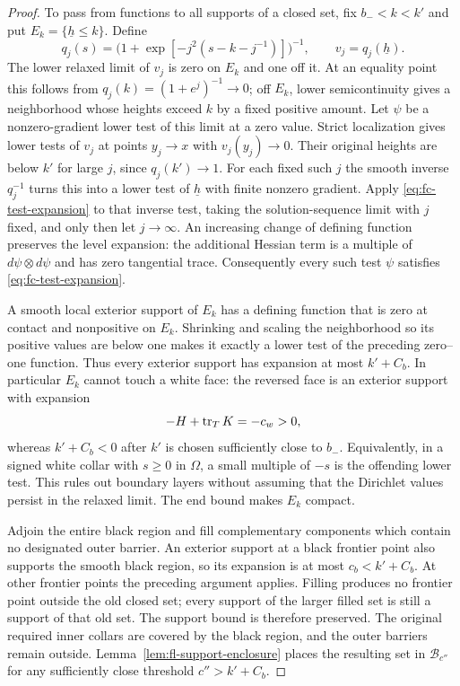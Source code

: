 \begin{proof}
To pass from functions to all supports of a closed set, fix
$b_-<k<k'$ and put $E_k=\{\underline h\le k\}$.  Define
\[
 q_j(s)=\bigl(1+\exp[-j^2(s-k-j^{-1})]\bigr)^{-1},
 \qquad v_j=q_j(\underline h).
\]
The lower relaxed limit of $v_j$ is zero on $E_k$ and one off it.
At an equality point this follows from
$q_j(k)=(1+e^j)^{-1}\to0$; off $E_k$, lower semicontinuity gives
a neighborhood whose heights exceed $k$ by a fixed positive amount.
Let $\psi$ be a nonzero-gradient lower test of this limit at a zero
value.  Strict localization gives lower tests of $v_j$ at points
$y_j\to x$ with $v_j(y_j)\to0$.  Their original heights are below
$k'$ for large $j$, since $q_j(k')\to1$.  For each fixed such $j$
the smooth inverse $q_j^{-1}$ turns this into a lower test of
$\underline h$ with finite nonzero gradient.  Apply
\eqref{eq:fc-test-expansion} to that inverse test, taking the
solution-sequence limit with $j$ fixed, and only then let
$j\to\infty$.  An increasing change of defining function preserves
the level expansion: the additional Hessian term is a multiple of
$d\psi\otimes d\psi$ and has zero tangential trace.  Consequently
every such test $\psi$ satisfies
\eqref{eq:fc-test-expansion}.

A smooth local exterior support of $E_k$ has a defining function
that is zero at contact and nonpositive on $E_k$.  Shrinking and
scaling the neighborhood so its positive values are below one
makes it exactly a lower test of the preceding zero--one function.
Thus every exterior support has expansion at most $k'+C_b$.
In particular $E_k$ cannot touch a white face: the reversed face is
an exterior support with expansion
\[
 -H+\operatorname{tr}_TK=-c_w>0,
\]
whereas $k'+C_b<0$ after $k'$ is chosen sufficiently close to $b_-$.
Equivalently, in a signed white collar with $s\ge0$ in $\Omega$,
a small multiple of $-s$ is the offending lower test.  This rules
out boundary layers without assuming that the Dirichlet values
persist in the relaxed limit.  The end bound makes $E_k$ compact.

Adjoin the entire black region and fill complementary components
which contain no designated outer barrier.  An exterior support at
a black frontier point also supports the smooth black region, so
its expansion is at most $c_b<k'+C_b$.  At other frontier points
the preceding argument applies.  Filling produces no frontier
point outside the old closed set; every support of the larger
filled set is still a support of that old set.  The support bound
is therefore preserved.  The original required inner collars are
covered by the black region, and the outer barriers remain outside.
Lemma~\ref{lem:fl-support-enclosure} places the resulting set in
$\mathcal B_{c''}$ for any sufficiently close threshold
$c''>k'+C_b$.


\end{proof}
